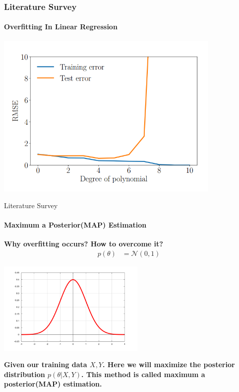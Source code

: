 \documentclass[handout,9pt]{beamer}
\numberwithin{theorem}{section}
\begin{document}
\begin{frame}
	\begin{spacing}{1}
		\frametitle{Literature Survey}
		\framesubtitle{Overfitting In Linear Regression}
		\begin{center}
			\includegraphics[height=8cm]{graph11}\\
		\end{center}
		
	\end{spacing}
\end{frame}

\begin{frame}{Literature Survey}
	\begin{spacing}{1}
		\framesubtitle{Maximum a Posterior(MAP) Estimation}
		\textbf{Why overfitting occurs? How to overcome it?}\pause
		\begin{align*}
			p(\theta) &= \mathcal{N}(0, 1)
		\end{align*}
		\begin{center}
			\includegraphics[width=\columnwidth, height=4.5cm]{graph12}
		\end{center}\pause
		\textbf{Given our training data $X, Y$. Here we will maximize the posterior distribution $p(\theta|X, Y)$. This method is called maximum a posterior(MAP) estimation.}\\
	\end{spacing}
\end{frame}
\end{document}
